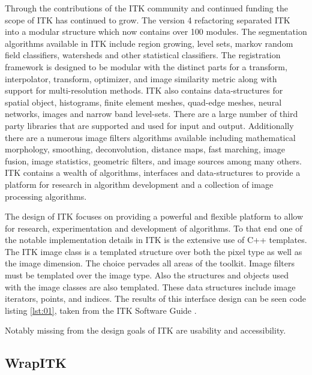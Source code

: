 \documentclass{frontiersMED} %
\begin{document}
Through the contributions of the ITK community and continued funding
the scope of ITK has continued to grow. The version 4 refactoring
separated ITK into a modular structure which now contains over 100
modules. The segmentation algorithms available in ITK include region
growing, level sets, markov random field classifiers, watersheds and
other statistical classifiers. The registration framework is designed
to be modular with the distinct parts for a transform, interpolator,
transform, optimizer, and image similarity metric along with support
for multi-resolution methods. ITK also contains data-structures for
spatial object, histograms, finite element meshes, quad-edge meshes,
neural networks, images and narrow band level-sets. There are a large
number of third party libraries that are supported and used for input
and output. Additionally there are a numerous image filters algorithms
available including mathematical morphology, smoothing, deconvolution,
distance maps, fast marching, image fusion, image statistics,
geometric filters, and image sources among many others. ITK contains a
wealth of algorithms, interfaces and data-structures to provide a
platform for research in algorithm development and a collection of
image processing algorithms.

The design of ITK focuses on providing a powerful and flexible
platform to allow for research, experimentation and development of
algorithms. To that end one of the notable implementation details in
ITK is the extensive use of C++ templates. The ITK image class is a
templated structure over both the pixel type as well as the image
dimension. The choice pervades all areas of the toolkit. Image filters
must be templated over the image type. Also the structures and objects
used with the image classes are also templated. These data structures
include image iterators, points, and indices. The results of this
interface design can be seen code listing \ref{lst:01}, taken from the
ITK Software Guide \cite{Ibanez2005}.



Notably missing from the design goals of ITK are usability and accessibility.


\subsection{WrapITK}
\end{document}
